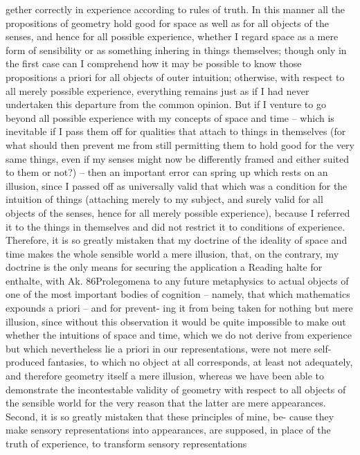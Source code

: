 gether correctly in experience according to rules of truth. In this manner
all the propositions of geometry hold good for space as well as for all
objects of the senses, and hence for all possible experience, whether I
regard space as a mere form of sensibility or as something inhering in
things themselves; though only in the ﬁrst case can I comprehend how
it may be possible to know those propositions a priori for all objects of
outer intuition; otherwise, with respect to all merely possible experience,
everything remains just as if I had never undertaken this departure from
the common opinion.
But if I venture to go beyond all possible experience with my concepts
of space and time – which is inevitable if I pass them off for qualities that
attach to things in themselves (for what should then prevent me from
still permitting them to hold good for the very same things, even if my
senses might now be differently framed and either suited to them or
not?) – then an important error can spring up which rests on an illusion,
since I passed off as universally valid that which was a condition for the
intuition of things (attaching merely to my subject, and surely valid for all
objects of the senses, hence for all merely possible experience), because I
referred it to the things in themselves and did not restrict it to conditions
of experience.
Therefore, it is so greatly mistaken that my doctrine of the ideality of
space and time makes the whole sensible world a mere illusion, that, on
the contrary, my doctrine is the only means for securing the application
a
Reading halte for enthalte, with Ak.
86Prolegomena to any future metaphysics
to actual objects of one of the most important bodies of cognition –
namely, that which mathematics expounds a priori – and for prevent-
ing it from being taken for nothing but mere illusion, since without
this observation it would be quite impossible to make out whether the
intuitions of space and time, which we do not derive from experience
but which nevertheless lie a priori in our representations, were not mere
self-produced fantasies, to which no object at all corresponds, at least
not adequately, and therefore geometry itself a mere illusion, whereas
we have been able to demonstrate the incontestable validity of geometry
with respect to all objects of the sensible world for the very reason that
the latter are mere appearances.
Second, it is so greatly mistaken that these principles of mine, be-
cause they make sensory representations into appearances, are supposed,
in place of the truth of experience, to transform sensory representations
